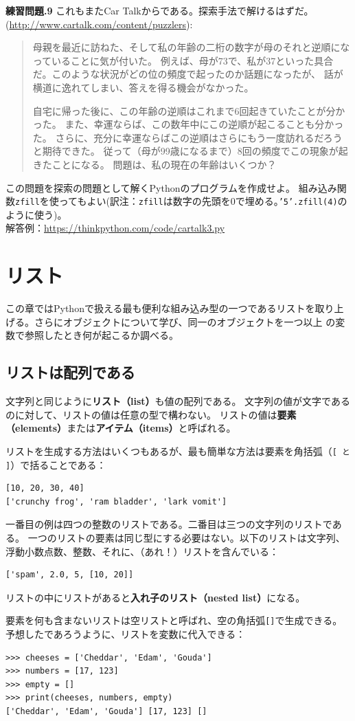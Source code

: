 \documentclass[a4j,12pt,makeidx]{jbook}
\newcommand{\tp}{\thechapter}
\begin{document}
\noindent
{\bf 練習問題\tp.9} これもまたCar Talkからである。探索手法で解けるはずだ。
(\url{http://www.cartalk.com/content/puzzlers}):
\begin{quote}
母親を最近に訪ねた、そして私の年齢の二桁の数字が母のそれと逆順になっていることに気が付いた。
例えば、母が73で、私が37といった具合だ。このような状況がどの位の頻度で起ったのか話題になったが、
話が横道に逸れてしまい、答えを得る機会がなかった。\par
自宅に帰った後に、この年齢の逆順はこれまで6回起きていたことが分かった。
また、幸運ならば、この数年中にこの逆順が起こることも分かった。
さらに、充分に幸運ならばこの逆順はさらにもう一度訪れるだろうと期待できた。
従って（母が99歳になるまで）8回の頻度でこの現象が起きたことになる。
問題は、私の現在の年齢はいくつか？
\end{quote}
この問題を探索の問題として解くPythonのプログラムを作成せよ。 
組み込み関数{\tt zfill}を使ってもよい(訳注：{\tt zfill}は数字の先頭を0で埋める。{\tt '5'.zfill(4)}のように使う)。\\
解答例：\url{https://thinkpython.com/code/cartalk3.py}
%
\chapter{リスト}
この章ではPythonで扱える最も便利な組み込み型の一つであるリストを取り上げる。さらにオブジェクトについて学び、同一のオブジェクトを一つ以上
の変数で参照したとき何が起こるか調べる。
\section{リストは配列である}
文字列と同じように{\bf リスト（list）}も値の配列である。
文字列の値が文字であるのに対して、リストの値は任意の型で構わない。
リストの値は{\bf 要素（elements）}または{\bf アイテム（items）}と呼ばれる。 \par
リストを生成する方法はいくつもあるが、最も簡単な方法は要素を角括弧（{\tt [ と ]}）で括ることである：
\begin{verbatim}
[10, 20, 30, 40]
['crunchy frog', 'ram bladder', 'lark vomit']
\end{verbatim}
一番目の例は四つの整数のリストである。二番目は三つの文字列のリストである。
一つのリストの要素は同じ型にする必要はない。以下のリストは文字列、浮動小数点数、整数、それに、（あれ！）リストを含んでいる：
\begin{verbatim}
['spam', 2.0, 5, [10, 20]]
\end{verbatim}
リストの中にリストがあると{\bf 入れ子のリスト（nested list）}になる。\par
要素を何も含まないリストは空リストと呼ばれ、空の角括弧{\tt []}で生成できる。
予想したであろうように、リストを変数に代入できる：
\begin{verbatim}
>>> cheeses = ['Cheddar', 'Edam', 'Gouda']
>>> numbers = [17, 123]
>>> empty = []
>>> print(cheeses, numbers, empty)
['Cheddar', 'Edam', 'Gouda'] [17, 123] []
\end{verbatim}
%
\end{document}
